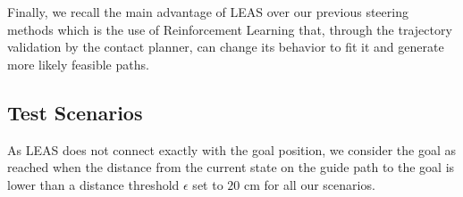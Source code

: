 \hfill

Finally, we recall the main advantage of LEAS over our previous steering methods which is the use of Reinforcement Learning that, through the trajectory validation by the contact planner, can change its behavior to fit it and generate more likely feasible paths.

\subsection{Test Scenarios\label{subsub:leas:test_scenarios}}

As LEAS does not connect exactly with the goal position, we consider the goal as reached when the distance from the current state on the guide path to the goal is lower than a distance threshold $\epsilon$ set to $20$ cm for all our scenarios.


